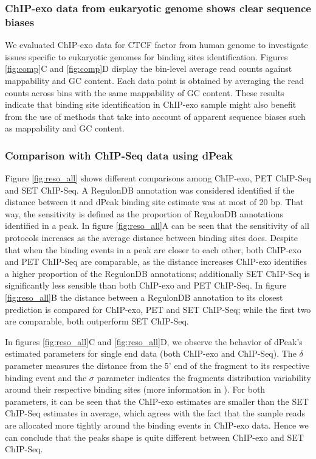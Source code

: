 \documentclass{bmcart}\usepackage[]{graphicx}\usepackage[]{color}
\begin{document}
\subsubsection{ChIP-exo data from eukaryotic genome shows clear sequence biases}
\label{sec:eukaryotic}

We evaluated ChIP-exo data for CTCF factor from human genome
\cite{exo1} to investigate issues specific to eukaryotic genomes for
binding sites identification. Figures \ref{fig:comp}C and
\ref{fig:comp}D display the bin-level average read counts against
mappability and GC content. Each data point is obtained by averaging
the read counts across bins with the same mappability of GC
content. These results indicate that binding site identification in
ChIP-exo sample might also benefit from the use of methods that take
into account of apparent sequence biases such as mappability and GC
content.


\subsubsection{Comparison with ChIP-Seq data using dPeak}
\label{sec:dpeak_analysis}



Figure \ref{fig:reso_all} shows different comparisons among ChIP-exo,
PET ChIP-Seq and SET ChIP-Seq. A RegulonDB annotation was considered
identified if the distance between it and dPeak binding site estimate
was at most of 20 bp. That way, the sensitivity is defined as
the proportion of RegulonDB annotations identified in a peak. In
figure \ref{fig:reso_all}A can be seen that the sensitivity of all
protocols increases as the average distance between binding sites
does. Despite that when the binding events in a peak are closer to
each other, both ChIP-exo and PET ChIP-Seq are comparable, as the
distance increases ChIP-exo identifies a higher proportion of the
RegulonDB annotations; additionally SET ChIP-Seq is significantly less
sensible than both ChIP-exo and PET ChIP-Seq. In figure
\ref{fig:reso_all}B the distance between a RegulonDB annotation to its
closest prediction is compared for ChIP-exo, PET and SET ChIP-Seq;
while the first two are comparable, both outperform SET ChIP-Seq.

In figures \ref{fig:reso_all}C and \ref{fig:reso_all}D, we observe the
behavior of dPeak's estimated parameters for single end data (both
ChIP-exo and ChIP-Seq). The $\delta$ parameter measures the distance
from the 5' end of the fragment to its respective binding event and
the $\sigma$ parameter indicates the fragments distribution
variability around their respective binding sites (more information in
\cite{dpeak}). For both parameters, it can be seen that the ChIP-exo
estimates are smaller than the SET ChIP-Seq estimates in average,
which agrees with the fact that the sample reads are allocated more
tightly around the binding events in ChIP-exo data. Hence we can
conclude that the peaks shape is quite different between ChIP-exo and
SET ChIP-Seq.
\end{document}
